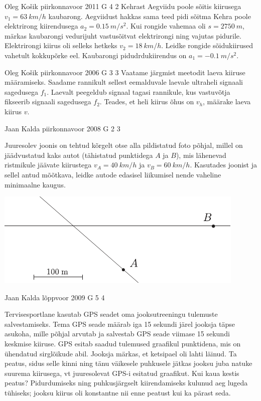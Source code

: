 \documentclass[11pt, twoside]{article}
\begin{document}
{%
{Oleg Košik} %
{piirkonnavoor} %
{2011} %
{G 4} %
{2} %
{
\ifStatement
Kehrast Aegviidu poole sõitis kiirusega $v_1=\SI{63}{km/h}$ kaubarong. Aegviidust hakkas sama teed pidi sõitma Kehra poole elektrirong kiirendusega $a_2=\SI{0,15}{m/s^2}$. Kui rongide vahemaa oli $s=\SI{2750}{m}$, märkas kaubarongi vedurijuht vastusõitvat elektrirongi ning vajutas pidurile. Elektrirongi kiirus oli selleks hetkeks $v_2=\SI{18}{km/h}$. Leidke rongide sõidukiirused vahetult kokkupõrke eel. Kaubarongi pidudrdukiirendus on $a_1=-\SI{0,1}{m/s^2}$.
\fi
}

{Oleg Košik} %
{piirkonnavoor} %
{2006} %
{G 3} %
{3} %
{
\ifStatement
Vaatame järgmist meetodit laeva kiiruse määramiseks. Saadame rannikult sellest eemalduvale laevale ultraheli signaali sagedusega $f_1$. Laevalt peegeldub signaal tagasi rannikule, kus vastuvõtja fikseerib signaali sagedusega $f_2$. Teades, et heli kiirus õhus on $v_h$, määrake laeva kiirus $v$.
\fi
}

{Jaan Kalda} %
{piirkonnavoor} %
{2008} %
{G 2} %
{3} %
{
\ifStatement
Juuresolev joonis on tehtud kõrgelt otse alla pildistatud foto põhjal, millel on jäädvustatud kaks autot (tähistatud punktidega $A$ ja $B$), mis lähenevad ristmikule jäävate kiirustega $v_A = \SI{40}{km/h}$ ja $v_B = \SI{60}{km/h}$. Kasutades joonist ja sellel antud mõõtkava, leidke autode edasisel liikumisel nende vaheline minimaalne kaugus.

\begin{center}
	\includegraphics[width=0.9\linewidth]{2008-v2g-02-yl}
\end{center}
\fi
}

{Jaan Kalda} %
{lõppvoor} %
{2009} %
{G 5} %
{4} %
{
\ifStatement
Tervisesportlane kasutab GPS seadet oma jooksutreeningu tulemuste salvestamiseks.
Tema GPS seade määrab iga 15 sekundi järel jooksja täpse asukoha, mille põhjal arvutab ja salvestab GPS seade viimase 15 sekundi keskmise kiiruse.
GPS esitab saadud tulemused graafikul punktidena, mis on ühendatud sirglõikude abil.
Jooksja märkas, et ketsipael oli lahti läinud.
Ta peatus, sidus selle kinni ning tänu väikesele puhkusele jätkas jooksu juba natuke suurema
kiirusega, vt juuresolevat GPS-i esitatud graafikut. Kui kaua kestis peatus? Pidurdumiseks ning puhkusjärgselt kiirendamiseks kulunud
aeg lugeda tühiseks; jooksu kiirus oli konstantne nii enne peatust kui ka pärast seda.

}}
\end{document}
